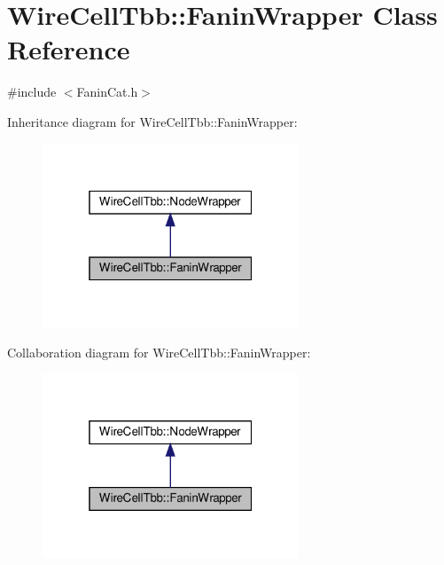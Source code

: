 \hypertarget{class_wire_cell_tbb_1_1_fanin_wrapper}{}\section{Wire\+Cell\+Tbb\+:\+:Fanin\+Wrapper Class Reference}
\label{class_wire_cell_tbb_1_1_fanin_wrapper}


{\ttfamily \#include $<$Fanin\+Cat.\+h$>$}



Inheritance diagram for Wire\+Cell\+Tbb\+:\+:Fanin\+Wrapper\+:
\nopagebreak
\begin{figure}[H]
\begin{center}
\leavevmode
\includegraphics[width=217pt]{class_wire_cell_tbb_1_1_fanin_wrapper__inherit__graph}
\end{center}
\end{figure}


Collaboration diagram for Wire\+Cell\+Tbb\+:\+:Fanin\+Wrapper\+:
\nopagebreak
\begin{figure}[H]
\begin{center}
\leavevmode
\includegraphics[width=217pt]{class_wire_cell_tbb_1_1_fanin_wrapper__coll__graph}
\end{center}
\end{figure}

